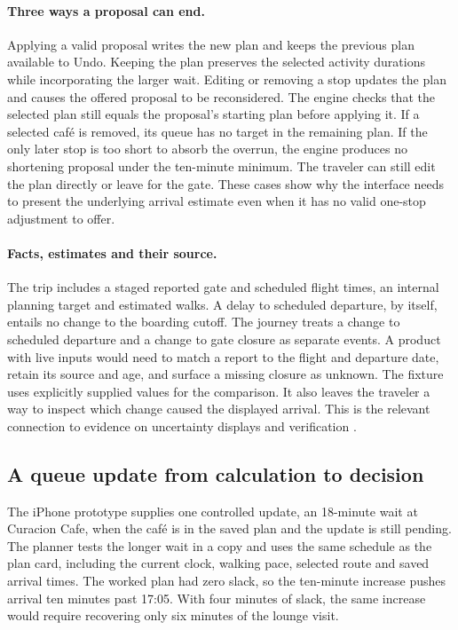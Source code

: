 \documentclass[sigconf,nonacm,balance=false]{acmart}
\begin{document}
\paragraph{Three ways a proposal can end.} Applying a valid proposal writes the new plan and keeps the previous plan available to Undo. Keeping the plan preserves the selected activity durations while incorporating the larger wait. Editing or removing a stop updates the plan and causes the offered proposal to be reconsidered. The engine checks that the selected plan still equals the proposal's starting plan before applying it. If a selected caf\'e is removed, its queue has no target in the remaining plan. If the only later stop is too short to absorb the overrun, the engine produces no shortening proposal under the ten-minute minimum. The traveler can still edit the plan directly or leave for the gate. These cases show why the interface needs to present the underlying arrival estimate even when it has no valid one-stop adjustment to offer.

\paragraph{Facts, estimates and their source.} The trip includes a staged reported gate and scheduled flight times, an internal planning target and estimated walks. A delay to scheduled departure, by itself, entails no change to the boarding cutoff. The journey treats a change to scheduled departure and a change to gate closure as separate events. A product with live inputs would need to match a report to the flight and departure date, retain its source and age, and surface a missing closure as unknown. The fixture uses explicitly supplied values for the comparison. It also leaves the traveler a way to inspect which change caused the displayed arrival. This is the relevant connection to evidence on uncertainty displays and verification \cite{ref8,ref219,ref222}.

\subsection{A queue update from calculation to decision}\label{sec:queue-rule}
The iPhone prototype supplies one controlled update, an 18-minute wait at Curacion Cafe, when the caf\'e is in the saved plan and the update is still pending. The planner tests the longer wait in a copy and uses the same schedule as the plan card, including the current clock, walking pace, selected route and saved arrival times. The worked plan had zero slack, so the ten-minute increase pushes arrival ten minutes past 17:05. With four minutes of slack, the same increase would require recovering only six minutes of the lounge visit.
\end{document}
